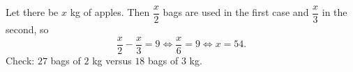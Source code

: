 Let there be $x$ kg of apples. Then $\dfrac {x}{2}$ bags are used in the first case and $\dfrac {x}{3}$ in the second, so
\[
\dfrac {x}{2}-\dfrac {x}{3}=9\iff\dfrac {x}{6}=9\iff x=\boxed{54}.
\]
Check: $27$ bags of $2$ kg versus $18$ bags of $3$ kg.

